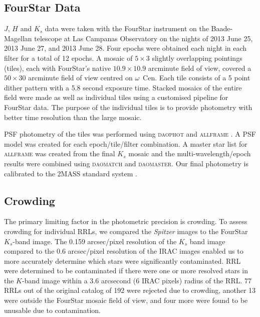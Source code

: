 \documentclass[a4paper,fleqn,usenatbib]{mnras}
\begin{document}
\subsection{FourStar Data}
\label{sec:fourstar_reduction}

$J$, $H$ and $K_s$ data were taken with the FourStar instrument on the Baade-Magellan telescope at Las Campanas Observatory \citep{2013PASP..125..654P} on the nights of 2013 June 25, 2013 June 27, and 2013 June 28. Four epochs were obtained each night in each filter for a total of 12 epochs. A mosaic of $5\times3$ slightly overlapping pointings (tiles), each with FourStar's native $10.9 \times 10.9$ arcminute field of view, covered a $50\times30$ arcminute field of view centred on $\omega$~Cen. Each tile consists of a 5 point dither pattern with a 5.8 second exposure time. Stacked mosaics of the entire field were made as well as individual tiles using a customised pipeline for FourStar data. The purpose of the individual tiles is to provide photometry with better time resolution than the large mosaic. 

PSF photometry of the tiles was performed using \textsc{daophot} and \textsc{allframe} \citep{1987PASP...99..191S, 1994PASP..106..250S}. A PSF model was created for each epoch/tile/filter combination. A master star list for \textsc{allframe} was created from the final $K_s$ mosaic and the multi-wavelength/epoch results were combined using \textsc{daomatch} and \textsc{daomaster}. Our final photometry is calibrated to the 2MASS standard system \citep{2006AJ....131.1163S}. 

\subsection{Crowding}
\label{sec:crowding}

The primary limiting factor in the photometric precision is crowding. To assess crowding for individual RRLs, we compared the {\it Spitzer} images to the FourStar $K_s$-band image. The 0.159 arcsec/pixel resolution of the $K_s$ band image compared to the 0.6 arcsec/pixel resolution of the IRAC images enabled us to more accurately determine which stars were significantly contaminated. RRL were determined to be contaminated if there were one or more resolved stars in the $K$-band image within a 3.6 arcsecond (6 IRAC pixels) radius of the RRL. 77 RRLs out of the original catalog of 192 \citep{2004A&A...424.1101K} were rejected due to crowding, another 13 were outside the FourStar mosaic field of view, and four more were found to be unusable due to contamination.
\end{document}
